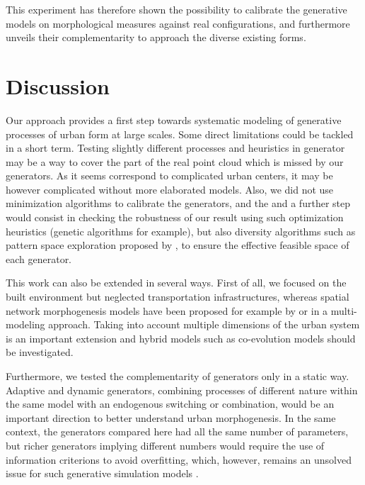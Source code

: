 \documentclass[letterpaper]{article}
\begin{document}
This experiment has therefore shown the possibility to calibrate the generative models on morphological measures against real configurations, and furthermore unveils their complementarity to approach the diverse existing forms.









\section{Discussion} \label{sec:discussion}


Our approach provides a first step towards systematic modeling of generative processes of urban form at large scales. Some direct limitations could be tackled in a short term. Testing slightly different processes and heuristics in generator may be a way to cover the part of the real point cloud which is missed by our generators. As it seems correspond to complicated urban centers, it may be however complicated without more elaborated models. Also, we did not use minimization algorithms to calibrate the generators, and the and a further step would consist in checking the robustness of our result using such optimization heuristics (genetic algorithms for example), but also diversity algorithms such as pattern space exploration proposed by \cite{10.1371/journal.pone.0138212}, to ensure the effective feasible space of each generator. 


This work can also be extended in several ways. First of all, we focused on the built environment but neglected transportation infrastructures, whereas spatial network morphogenesis models have been proposed for example by \cite{courtat2011mathematics} or \cite{raimbault2018multi} in a multi-modeling approach.
Taking into account multiple dimensions of the urban system is an important extension and hybrid models such as co-evolution models \citep{raimbault2014hybrid} should be investigated.

Furthermore, we tested the complementarity of generators only in a static way. Adaptive and dynamic generators, combining processes of different nature within the same model with an endogenous switching or combination, would be an important direction to better understand urban morphogenesis.
In the same context, the generators compared here had all the same number of parameters, but richer generators implying different numbers would require the use of information criterions to avoid overfitting, which, however, remains an unsolved issue for such generative simulation models \citep{piou2009proposing}.
\end{document}
